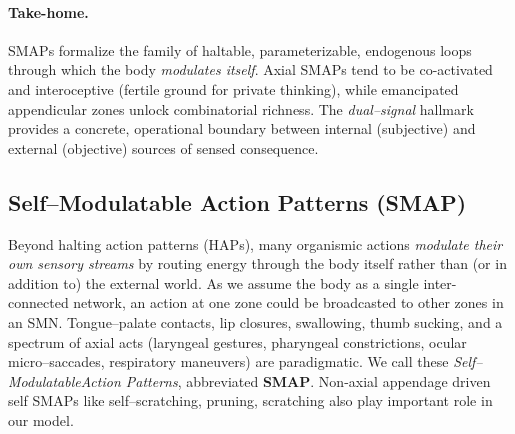 \paragraph{Take-home.}
SMAPs formalize the family of haltable, parameterizable, endogenous loops through which the body \emph{modulates itself}. Axial SMAPs tend to be co-activated and interoceptive (fertile ground for private thinking), while emancipated appendicular zones unlock combinatorial richness. The \emph{dual–signal} hallmark provides a concrete, operational boundary between internal (subjective) and external (objective) sources of sensed consequence.




\subsection{Self–Modulatable Action Patterns (SMAP)}
\label{subsec:SMAP}

Beyond halting action patterns (HAPs), many organismic actions \emph{modulate their own sensory streams} by routing energy through the body itself rather than (or in addition to) the external world. As we assume the body as a single inter-connected network, an action at one zone could be broadcasted to other zones in an SMN. Tongue–palate contacts, lip closures, swallowing,  thumb sucking, and a spectrum of axial acts (laryngeal gestures, pharyngeal constrictions, ocular micro–saccades, respiratory maneuvers) are paradigmatic. We call these \emph{Self–ModulatableAction Patterns}, abbreviated \textbf{SMAP}.  Non-axial appendage driven self SMAPs like self–scratching, pruning, scratching also play important role in our model. 

